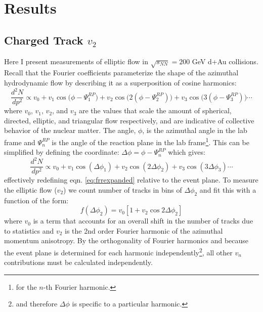 
\chapter{Results} %
\section{Charged Track $v_{2}$}
\label{sect:alltracks}
Here I present measurements of elliptic flow in $\sqrt{s_{NN}}=200$ GeV d+Au collisions. Recall that the Fourier coefficients parameterize the shape of the azimuthal hydrodynamic flow by describing it as a superposition of cosine harmonics:
\begin{equation} \label{eq:frrexpanded}
\frac{d^{2}N}{dp^{2}} \propto v_0 + v_1 \cos\big(\phi - \Psi^{RP}_1\big) + v_2 \cos\big(2(\phi - \Psi^{RP}_2)\big) + v_3 \cos\big(3(\phi - \Psi^{RP}_3)\big) \cdots
\end{equation}
where $v_0$, $v_1$, $v_2$, and $v_3$ are the values that scale the amount of spherical, directed, elliptic, and triangular flow respectively, and are indicative of collective behavior of the nuclear matter. The angle, $\phi$, is the azimuthal angle in the lab frame and $\Psi^{RP}_n$ is the angle of the reaction plane in the lab frame\footnote{for the $n$-th Fourier harmonic.}. This can be simplified by defining the coordinate: $\Delta \phi = \phi - \Psi^{RP}_n$ which gives:
\begin{equation} 
\frac{d^{2}N}{dp^{2}} \propto v_0 + v_1 \cos(\Delta \phi _1) + v_2 \cos(2\Delta \phi _2) + v_3 \cos(3\Delta \phi _3) \cdots
\end{equation}
effectively redefining eqn. \ref{eq:frrexpanded} relative to the event plane. To measure the elliptic flow ($v_2$) we count number of tracks in bins of $\Delta \phi_2$ and fit this with a function of the form:
\begin{equation}
\label{v2fitfn}
f(\Delta \phi_2) = v_0 [1 + v_2 \cos 2 \Delta \phi_2]
\end{equation}
where $v_0$ is a term that accounts for an overall shift in the number of tracks due to statistics and $v_2$ is the 2nd order Fourier harmonic of the azimuthal momentum anisotropy. By the orthogonality of Fourier harmonics and because the event plane is determined for each harmonic independently\footnote{and therefore $\Delta \phi$ is specific to a particular harmonic.}, all other $v_n$ contributions must be calculated independently.


